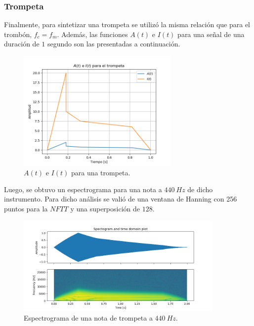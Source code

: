 \subsubsection{Trompeta}
Finalmente, para sintetizar una trompeta se utilizó la misma relación que para el trombón, $f_c = f_m$. Además, las funciones $A(t)$ e $I(t)$ para una señal de una duración de $1$ segundo son las presentadas a continuación.
\begin{figure}[H]
	\centering
	\includegraphics[width=0.7\textwidth]{ImagenesEjercicio3/A-I-Trumpet.png}
	\caption{$A(t)$ e $I(t)$ para una trompeta.}
	\label{fig:aitrumpet}
\end{figure}

Luego, se obtuvo un espectrograma para una nota a $440 \ Hz$ de dicho instrumento. Para dicho análisis se valió de una ventana de Hanning con 256 puntos para la $NFTT$ y una superposición de $128$.  
\begin{figure}[H]
	\centering
	\includegraphics[width=0.9\textwidth]{ImagenesEjercicio3/Trumpet-440-Hanning-256-128.png}
	\caption{Espectrograma de una nota de trompeta a $440 \ Hz$.}
	\label{fig:spectrumpet}
\end{figure}
 
